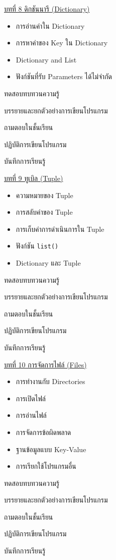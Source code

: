 {
\underline{บทที่ 8 ดิกชันนารี (Dictionary)}
\begin{itemize}
\item การอ่านค่าใน Dictionary
\item การหาค่าของ Key ใน Dictionary
\item Dictionary and List
\item ฟังก์ชันที่รับ Parameters ได้ไม่จำกัด
\end{itemize}
}
{
\item ทดสอบทบทวนความรู้
\item  บรรยายและยกตัวอย่างการเขียนโปรแกรม
\item  ถามตอบในชั้นเรียน
\item  ปฏิบัติการเขียนโปรแกรม
\item  บันทึกการเรียนรู้
}
{
\underline{บทที่ 9 ทูเบิล (Tuple)}
\begin{itemize}
\item ความหมายของ Tuple
\item การสลับค่าของ Tuple
\item การเก็บค่าการดำเนินการใน Tuple
\item ฟังก์ชัน  \texttt{list()}
\item Dictionary และ Tuple
\end{itemize}
}
{
\item ทดสอบทบทวนความรู้
\item  บรรยายและยกตัวอย่างการเขียนโปรแกรม
\item  ถามตอบในชั้นเรียน
\item  ปฏิบัติการเขียนโปรแกรม
\item  บันทึกการเรียนรู้
}
{
\underline{บทที่ 10 การจัดการไฟล์ (Files)}
\begin{itemize}
\item การทำงานกับ Directories
\item การเปิดไฟล์
\item การอ่านไฟล์
\item การจัดการข้อผิดพลาด
\item ฐานข้อมูลแบบ Key-Value
\item การเรียกใช้โปรแกรมอื่น
\end{itemize}
}
{
\item ทดสอบทบทวนความรู้
\item  บรรยายและยกตัวอย่างการเขียนโปรแกรม
\item  ถามตอบในชั้นเรียน
\item  ปฏิบัติการเขียนโปรแกรม
\item  บันทึกการเรียนรู้
}
